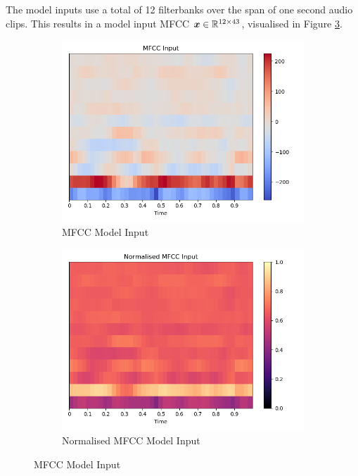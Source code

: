 The model inputs use a total of 12 filterbanks over the span of one second audio clips.
This results in a model input MFCC ${\boldsymbol{{x}}} \in \mathbb{R}^{12 \times 43}$, visualised in Figure \ref{fig:mfcc_model_input}.

\begin{figure}[h!]
    \centering
    \begin{subfigure}[b]{0.49\textwidth}
        \includegraphics[width=\textwidth]{figures/mfcc/mfcc_input.png}
        \caption{MFCC Model Input}\label{fig:mfcc_input}
    \end{subfigure}
    \begin{subfigure}[b]{0.49\textwidth}
        \includegraphics[width=\textwidth]{figures/mfcc/norm_mfcc_input.png}
        \caption{Normalised MFCC Model Input}\label{fig:mfcc_norm_input}
    \end{subfigure}
    \caption{MFCC Model Input}\label{fig:mfcc_model_input}
\end{figure}

